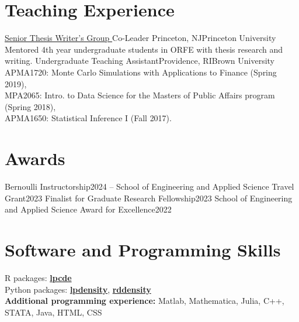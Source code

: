 \documentclass[10pt,a4paper,roman]{moderncv}        %
\begin{document}
\section{Teaching Experience}
{\color{blue}\href{https://orfe.princeton.edu/undergraduate/stwg}{Senior Thesis
    Writer's Group }\color{black} Co-Leader}
{Princeton, NJ}{Princeton University}
{Mentored 4th year undergraduate students in ORFE with thesis research and writing.}
{Undergraduate Teaching Assistant}{Providence, RI}{Brown University}
{APMA1720: Monte Carlo Simulations with Applications to Finance (Spring 2019), \\
MPA2065: Intro. to Data Science for the Masters of Public Affairs program (Spring 2018),
\\
APMA1650: Statistical Inference I (Fall 2017).
}



\vspace{-0.3cm}
\section{Awards}
{Bernoulli Instructorship}{2024 --}
{}{}
{School of Engineering and Applied Science Travel Grant}{2023}
{}{}
{Finalist for Graduate Research Fellowship}{2023}
{}{}
{School of Engineering and Applied Science Award for Excellence}{2022}
{}{}

\section{Software and Programming Skills}
R packages:
\color{blue}\href{https://nppackages.github.io/lpcde/}{\textbf{lpcde}}\color{black}
\\
Python packages: \color{blue}\href{https://nppackages.github.io/lpdensity_doc/}
{\textbf{lpdensity}}\color{black},
\color{blue}\href{https://rdpackages.github.io/rddensity_doc/}
{\textbf{rddensity}}\color{black}
\\
\textbf{Additional programming experience:}
Matlab, Mathematica, Julia, C++, STATA, Java, HTML, CSS
\end{document}
